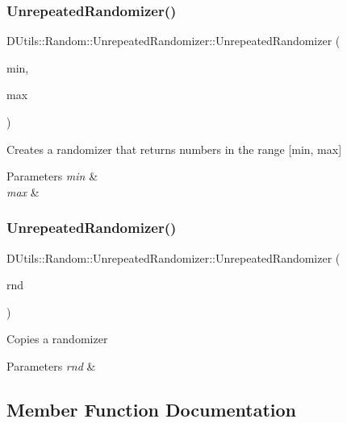\subsubsection{\texorpdfstring{Unrepeated\+Randomizer()}{UnrepeatedRandomizer()}\hspace{0.1cm}{\footnotesize\ttfamily [1/2]}}
{\footnotesize\ttfamily D\+Utils\+::\+Random\+::\+Unrepeated\+Randomizer\+::\+Unrepeated\+Randomizer (\begin{DoxyParamCaption}\item[{int}]{min,  }\item[{int}]{max }\end{DoxyParamCaption})}

Creates a randomizer that returns numbers in the range \mbox{[}min, max\mbox{]} 
\begin{DoxyParams}{Parameters}
{\em min} & \\
\hline
{\em max} & \\
\hline
\end{DoxyParams}
\mbox{\label{classDUtils_1_1Random_1_1UnrepeatedRandomizer_af4d4b9621cb9a55ec59fb311798a3a5b}} 
\subsubsection{\texorpdfstring{Unrepeated\+Randomizer()}{UnrepeatedRandomizer()}\hspace{0.1cm}{\footnotesize\ttfamily [2/2]}}
{\footnotesize\ttfamily D\+Utils\+::\+Random\+::\+Unrepeated\+Randomizer\+::\+Unrepeated\+Randomizer (\begin{DoxyParamCaption}\item[{const \hyperlink{classDUtils_1_1Random_1_1UnrepeatedRandomizer}{Unrepeated\+Randomizer} \&}]{rnd }\end{DoxyParamCaption})}

Copies a randomizer 
\begin{DoxyParams}{Parameters}
{\em rnd} & \\
\hline
\end{DoxyParams}


\subsection{Member Function Documentation}
\mbox{\label{classDUtils_1_1Random_1_1UnrepeatedRandomizer_a583497053acec6991b9a872f924e8ccb}} 

